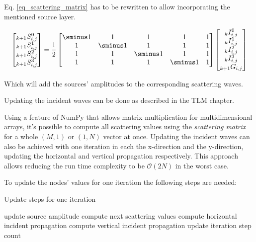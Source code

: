 \documentclass[twocolumn]{article}
\begin{document}
Eq. \ref{eq_scattering_matrix} has to be rewritten to allow incorporating the
mentioned source layer.

\begin{equation}
\begin{bmatrix}
    _{k+1}S_{i,j}^{0} \\
    _{k+1}S_{i,j}^{1} \\
    _{k+1}S_{i,j}^{2} \\
    _{k+1}S_{i,j}^{3} \\
\end{bmatrix}
=
\frac{1}{2}
\begin{bmatrix}
    \sminus1 & 1 & 1 & 1 & 1\\
    1 & \sminus1 & 1 & 1 & 1\\
    1 & 1 & \sminus1 & 1 & 1\\
    1 & 1 & 1 & \sminus1 & 1\\
\end{bmatrix}
\begin{bmatrix}
    _kI_{i,j}^{0} \\
    _kI_{i,j}^{1} \\
    _kI_{i,j}^{2} \\
    _kI_{i,j}^{3} \\
    _{k+1}G_{i,j} \\
\end{bmatrix}
\label{eq_source_scattering_matrix}
\end{equation}

Which will add the sources' amplitudes to the corresponding scattering waves.

Updating the incident waves can be done as described in the TLM chapter.

Using a feature of NumPy that allows matrix multiplication for multidimensional
arrays, it's possible to compute all scattering values using the \textit{scattering matrix}
for a whole $\left(M, 1\right)$ or $\left(1, N\right)$ vector at once.
Updating the incident waves can also be achieved with one iteration in each the x-direction
and the y-direction, updating the horizontal and vertical propagation respectively.
This approach allows reducing the run time complexity to be $\mathcal{O}\left(2N\right)$
in the worst case.

To update the nodes' values for one iteration the following steps are needed:
\begin{algorithm}[H]
\caption{Update steps for one iteration}
\begin{algorithmic}[1]
        \State update source amplitude
    \EndFor
        \State compute next scattering values
        \State compute horizontal incident propagation
    \EndFor
        \State compute vertical incident propagation
    \EndFor
    \State update iteration step count
    \EndProcedure
\end{algorithmic}
\end{algorithm}
\end{document}
